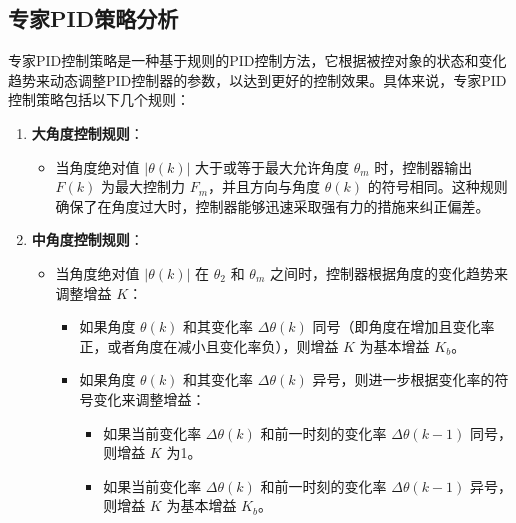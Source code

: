 \documentclass[12pt,a4paper,UTF8]{article}
\begin{document}
\clearpage
\subsection{专家PID策略分析}

专家PID控制策略是一种基于规则的PID控制方法，它根据被控对象的状态和变化趋势来动态调整PID控制器的参数，以达到更好的控制效果。具体来说，专家PID控制策略包括以下几个规则：

\begin{enumerate}
    \item \textbf{大角度控制规则}：
    \begin{itemize}
        \item 当角度绝对值 $|\theta(k)|$ 大于或等于最大允许角度 $\theta_m$ 时，控制器输出 $F(k)$ 为最大控制力 $F_m$，并且方向与角度 $\theta(k)$ 的符号相同。这种规则确保了在角度过大时，控制器能够迅速采取强有力的措施来纠正偏差。
    \end{itemize}
    
    \item \textbf{中角度控制规则}：
    \begin{itemize}
        \item 当角度绝对值 $|\theta(k)|$ 在 $\theta_2$ 和 $\theta_m$ 之间时，控制器根据角度的变化趋势来调整增益 $K$：
        \begin{itemize}
            \item 如果角度 $\theta(k)$ 和其变化率 $\Delta \theta(k)$ 同号（即角度在增加且变化率正，或者角度在减小且变化率负），则增益 $K$ 为基本增益 $K_b$。
            \item 如果角度 $\theta(k)$ 和其变化率 $\Delta \theta(k)$ 异号，则进一步根据变化率的符号变化来调整增益：
            \begin{itemize}
                \item 如果当前变化率 $\Delta \theta(k)$ 和前一时刻的变化率 $\Delta \theta(k-1)$ 同号，则增益 $K$ 为1。
                \item 如果当前变化率 $\Delta \theta(k)$ 和前一时刻的变化率 $\Delta \theta(k-1)$ 异号，则增益 $K$ 为基本增益 $K_b$。
            \end{itemize}
        \end{itemize}
    \end{itemize}
    

\end{enumerate}
\end{document}
